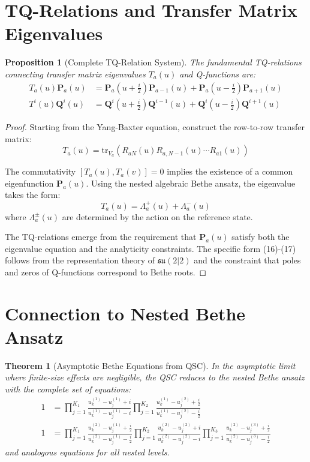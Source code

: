 \documentclass[11pt]{article}
\newtheorem{theorem}{Theorem}
\newtheorem{proposition}{Proposition}
\begin{document}
\section{TQ-Relations and Transfer Matrix Eigenvalues}

\begin{proposition}[Complete TQ-Relation System]
The fundamental TQ-relations connecting transfer matrix eigenvalues $T_a(u)$ and Q-functions are:
\begin{align}
T_a(u) \mathbf{P}_a(u) &= \mathbf{P}_a(u+\frac{i}{2}) \mathbf{P}_{a-1}(u) + \mathbf{P}_a(u-\frac{i}{2}) \mathbf{P}_{a+1}(u) \\
T^i(u) \mathbf{Q}^i(u) &= \mathbf{Q}^i(u+\frac{i}{2}) \mathbf{Q}^{i-1}(u) + \mathbf{Q}^i(u-\frac{i}{2}) \mathbf{Q}^{i+1}(u)
\end{align}
\end{proposition}

\begin{proof}
Starting from the Yang-Baxter equation, construct the row-to-row transfer matrix:
\begin{equation}
T_a(u) = \text{tr}_{V_a}(R_{aN}(u) R_{a,N-1}(u) \cdots R_{a1}(u))
\end{equation}

The commutativity $[T_a(u), T_a(v)] = 0$ implies the existence of a common eigenfunction $\mathbf{P}_a(u)$. Using the nested algebraic Bethe ansatz, the eigenvalue takes the form:
\begin{equation}
T_a(u) = \Lambda_a^+(u) + \Lambda_a^-(u)
\end{equation}
where $\Lambda_a^{\pm}(u)$ are determined by the action on the reference state.

The TQ-relations emerge from the requirement that $\mathbf{P}_a(u)$ satisfy both the eigenvalue equation and the analyticity constraints. The specific form (16)-(17) follows from the representation theory of $\mathfrak{su}(2|2)$ and the constraint that poles and zeros of Q-functions correspond to Bethe roots.
\end{proof}

\section{Connection to Nested Bethe Ansatz}

\begin{theorem}[Asymptotic Bethe Equations from QSC]
In the asymptotic limit where finite-size effects are negligible, the QSC reduces to the nested Bethe ansatz with the complete set of equations:
\begin{align}
1 &= \prod_{j=1}^{K_1} \frac{u_k^{(1)} - u_j^{(1)} + i}{u_k^{(1)} - u_j^{(1)} - i} \prod_{j=1}^{K_2} \frac{u_k^{(1)} - u_j^{(2)} + \frac{i}{2}}{u_k^{(1)} - u_j^{(2)} - \frac{i}{2}} \\
1 &= \prod_{j=1}^{K_1} \frac{u_k^{(2)} - u_j^{(1)} + \frac{i}{2}}{u_k^{(2)} - u_j^{(1)} - \frac{i}{2}} \prod_{j=1}^{K_2} \frac{u_k^{(2)} - u_j^{(2)} + i}{u_k^{(2)} - u_j^{(2)} - i} \prod_{j=1}^{K_3} \frac{u_k^{(2)} - u_j^{(3)} + \frac{i}{2}}{u_k^{(2)} - u_j^{(3)} - \frac{i}{2}}
\end{align}
and analogous equations for all nested levels.
\end{theorem}
\end{document}
